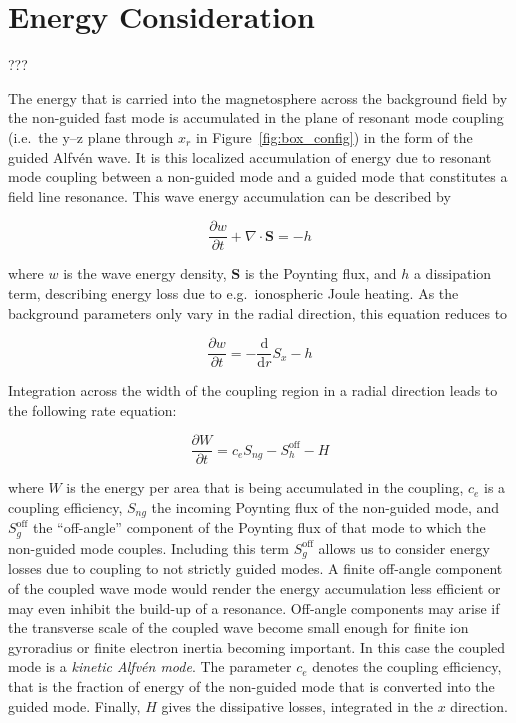 \documentclass[
  notoc %
]{tufte-book}
\begin{document}
\hypertarget{energy-consideration}{%
\section{Energy Consideration}\label{energy-consideration}}

???

The energy that is carried into the magnetosphere across the background
field by the non-guided fast mode is accumulated in the plane of
resonant mode coupling (i.e.~the y--z plane through \(x_r\) in
Figure~\ref{fig:box_config}) in the form of the guided Alfvén wave. It
is this localized accumulation of energy due to resonant mode coupling
between a non-guided mode and a guided mode that constitutes a field
line resonance. This wave energy accumulation can be described by

\[
\frac{\partial w}{\partial t} + \nabla\cdot\mathbf{S} = -h
\]

where \(w\) is the wave energy density, \(\mathbf{S}\) is the Poynting
flux, and \(h\) a dissipation term, describing energy loss due to
e.g.~ionospheric Joule heating. As the background parameters only vary
in the radial direction, this equation reduces to

\[
\frac{\partial w}{\partial t} = -\frac{\mathrm{d}}{\mathrm{d}r}S_x - h
\]

Integration across the width of the coupling region in a radial
direction leads to the following rate equation:

\[
\frac{\partial W}{\partial t} = c_e S_{ng} - S_h^{\text{off}} - H
\]

where \(W\) is the energy per area that is being accumulated in the
coupling, \(c_e\) is a coupling efficiency, \(S_{ng}\) the incoming
Poynting flux of the non-guided mode, and \(S_g^{\text{off}}\) the
``off-angle'' component of the Poynting flux of that mode to which the
non-guided mode couples. Including this term \(S_g^{\text{off}}\) allows
us to consider energy losses due to coupling to not strictly guided
modes. A finite off-angle component of the coupled wave mode would
render the energy accumulation less efficient or may even inhibit the
build-up of a resonance. Off-angle components may arise if the
transverse scale of the coupled wave become small enough for finite ion
gyroradius or finite electron inertia becoming important. In this case
the coupled mode is a \emph{kinetic Alfvén mode}. The parameter \(c_e\)
denotes the coupling efficiency, that is the fraction of energy of the
non-guided mode that is converted into the guided mode. Finally, \(H\)
gives the dissipative losses, integrated in the \(x\) direction.
\end{document}
